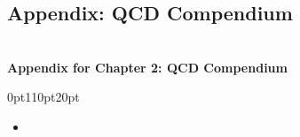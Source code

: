 

\begin{subappendices}



\iffalse
\titleformat{\chapter}[display]
{\normalfont\huge\bfseries\sffamily}{}{0pt}{\chaptitlenonumber}

\titlespacing*{\chapter}{0pt}{0pt}{0pt}
\clearpage
\chapter*{\hspace{-30pt}Appendix: QCD Compendium}
%
    {\bf\\Appendix for Chapter 2: QCD Compendium}

\titleformat{\chapter}[display]
{\normalfont\huge\bfseries\sffamily}{}{25pt}{\chaptitle}
\titlespacing*{\chapter} {0pt}{110pt}{20pt}



\begin{itemize}
    \item


\end{itemize}
\end{subappendices}
